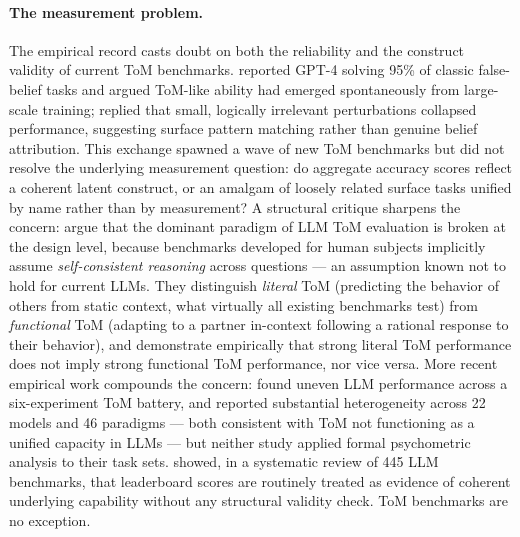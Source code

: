 \documentclass{article} %
\begin{document}
\paragraph{The measurement problem.}
The empirical record casts doubt on both the reliability and the
construct validity of current ToM benchmarks.
\citet{kosinski2024evaluating} reported GPT-4 solving 95\% of classic
false-belief tasks and argued ToM-like ability had emerged
spontaneously from large-scale training; \citet{ullman2023large}
replied that small, logically irrelevant perturbations collapsed
performance, suggesting surface pattern matching rather than genuine
belief attribution.
This exchange spawned a wave of new ToM benchmarks but did not resolve
the underlying measurement question: do aggregate accuracy scores
reflect a coherent latent construct, or an amalgam of loosely related
surface tasks unified by name rather than by measurement?
A structural critique sharpens the concern: \citet{riemer2024position}
argue that the dominant paradigm of LLM ToM evaluation is broken at the
design level, because benchmarks developed for human subjects implicitly
assume \textit{self-consistent reasoning} across questions --- an
assumption known not to hold for current LLMs.
They distinguish \textit{literal} ToM (predicting the behavior of
others from static context, what virtually all existing benchmarks
test) from \textit{functional} ToM (adapting to a partner in-context
following a rational response to their behavior), and demonstrate
empirically that strong literal ToM performance does not imply strong
functional ToM performance, nor vice versa.
More recent empirical work compounds the concern:
\citet{jones2024comparing} found uneven LLM performance across a
six-experiment ToM battery, and \citet{tong2026cogtom} reported
substantial heterogeneity across 22 models and 46 paradigms --- both
consistent with ToM not functioning as a unified capacity in LLMs ---
but neither study applied formal psychometric analysis to their task
sets.
\citet{bean2026measuring} showed, in a systematic review of 445 LLM
benchmarks, that leaderboard scores are routinely treated as evidence of
coherent underlying capability without any structural validity check.
ToM benchmarks are no exception.
\end{document}
